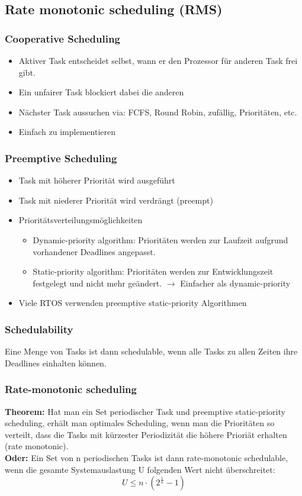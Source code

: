 \subsection{Rate monotonic scheduling (RMS)}
\subsubsection{Cooperative Scheduling}
  \begin{itemize}
    \item Aktiver Task entscheidet selbst, wann er den Prozessor für anderen
    Task frei gibt. 
    \item Ein unfairer Task blockiert dabei die anderen
    \item Nächster Task aussuchen via: FCFS, Round Robin, zufällig, Prioritäten, etc.
    \item Einfach zu implementieren
  \end{itemize}
\subsubsection{Preemptive Scheduling}
  \begin{itemize}
    \item Task mit höherer Priorität wird ausgeführt
    \item Task mit niederer Priorität wird verdrängt (preempt)
    \item Prioritätsverteilungsmöglichkeiten
      \begin{itemize}
        \item Dynamic-priority algorithm: Prioritäten werden zur Laufzeit
        aufgrund vorhandener Deadlines angepasst. 
        \item Static-priority algorithm: Prioritäten werden zur Entwicklungszeit
        festgelegt und nicht mehr geändert. $\rightarrow$ Einfacher als dynamic-priority
      \end{itemize}
    \item Viele RTOS verwenden preemptive static-priority Algorithmen 
  \end{itemize}
\subsubsection{Schedulability}
 Eine Menge von Tasks ist dann schedulable, wenn alle Tasks zu allen Zeiten ihre Deadlines einhalten können.
\subsubsection{Rate-monotonic scheduling}
\textbf{Theorem:} 
Hat man ein Set periodischer Task und preemptive static-priority scheduling,
erhält man optimales Scheduling, wenn man die Prioritäten so verteilt, dass die
Tasks mit kürzester Periodizität die höhere Prioriät erhalten (rate
monotonic).\\
\textbf{Oder:}
Ein Set von n periodischen Tasks ist dann rate-monotonic schedulable, wenn die gesamte Systemauslastung U folgenden Wert nicht überschreitet: 
\begin{equation}
U \leq n\cdot(2^\frac{1}{n}-1)
\end{equation}

